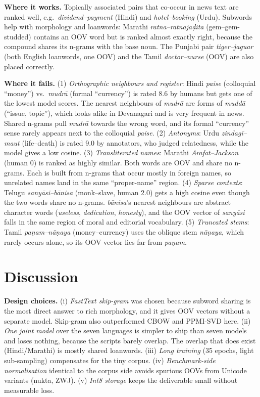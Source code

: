 \documentclass[11pt,a4paper]{article}
\begin{document}
\textbf{Where it works.} Topically associated pairs that co-occur in news text are ranked well, e.g.\ \textit{dividend--payment} (Hindi) and \textit{hotel--booking} (Urdu). Subwords help with morphology and loanwords: Marathi \textit{ratna--ratnajaḍita} (gem--gem-studded) contains an OOV word but is ranked almost exactly right, because the compound shares its n-grams with the base noun. The Punjabi pair \textit{tiger--jaguar} (both English loanwords, one OOV) and the Tamil \textit{doctor--nurse} (OOV) are also placed correctly.

\textbf{Where it fails.} (1) \emph{Orthographic neighbours and register}: Hindi \textit{paise} (colloquial ``money'') vs.\ \textit{mudrā} (formal ``currency'') is rated 8.6 by humans but gets one of the lowest model scores. The nearest neighbours of \textit{mudrā} are forms of \textit{muddā} (``issue, topic''), which looks alike in Devanagari and is very frequent in news. Shared n-grams pull \textit{mudrā} towards the wrong word, and its formal ``currency'' sense rarely appears next to the colloquial \textit{paise}. (2) \emph{Antonyms}: Urdu \textit{zindagī--maut} (life--death) is rated 9.0 by annotators, who judged relatedness, while the model gives a low cosine. (3) \emph{Transliterated names}: Marathi \textit{Arafat--Jackson} (human 0) is ranked as highly similar. Both words are OOV and share no n-grams. Each is built from n-grams that occur mostly in foreign names, so unrelated names land in the same ``proper-name'' region. (4) \emph{Sparse contexts}: Telugu \textit{sanyāsi--bānisa} (monk--slave, human 2.0) gets a high cosine even though the two words share no n-grams. \textit{bānisa}'s nearest neighbours are abstract character words (\textit{useless}, \textit{dedication}, \textit{honesty}), and the OOV vector of \textit{sanyāsi} falls in the same region of moral and editorial vocabulary. (5) \emph{Truncated stems}: Tamil \textit{paṇam--nāṇaya} (money--currency) uses the oblique stem \textit{nāṇaya}, which rarely occurs alone, so its OOV vector lies far from \textit{paṇam}.

\section{Discussion}
\textbf{Design choices.} (i) \emph{FastText skip-gram} was chosen because subword sharing is the most direct answer to rich morphology, and it gives OOV vectors without a separate model. Skip-gram also outperformed CBOW and PPMI-SVD here. (ii) \emph{One joint model} over the seven languages is simpler to ship than seven models and loses nothing, because the scripts barely overlap. The overlap that does exist (Hindi/Marathi) is mostly shared loanwords. (iii) \emph{Long training} (35 epochs, light sub-sampling) compensates for the tiny corpus. (iv) \emph{Benchmark-side normalisation} identical to the corpus side avoids spurious OOVs from Unicode variants (nukta, ZWJ). (v) \emph{Int8 storage} keeps the deliverable small without measurable loss.
\end{document}
